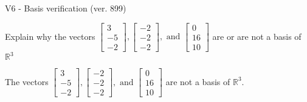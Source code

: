 \begin{exercise}
  \begin{exerciseTitle}V6 - Basis verification (ver. 899)\end{exerciseTitle}
  \begin{exerciseStatement}
    Explain why the vectors \(\left[\begin{array}{r}
3 \\
-5 \\
-2
\end{array}\right] , \left[\begin{array}{r}
-2 \\
-2 \\
-2
\end{array}\right] , \text{ and } \left[\begin{array}{r}
0 \\
16 \\
10
\end{array}\right]\) are or are not a basis of \(\mathbb{R}^3\)	


  \end{exerciseStatement}
  \begin{exerciseAnswer}
   The vectors \(\left[\begin{array}{r}
3 \\
-5 \\
-2
\end{array}\right] , \left[\begin{array}{r}
-2 \\
-2 \\
-2
\end{array}\right] , \text{ and } \left[\begin{array}{r}
0 \\
16 \\
10
\end{array}\right]\) 
  	 are not  a basis of \(\mathbb{R}^3\).
  


  \end{exerciseAnswer}
\end{exercise}